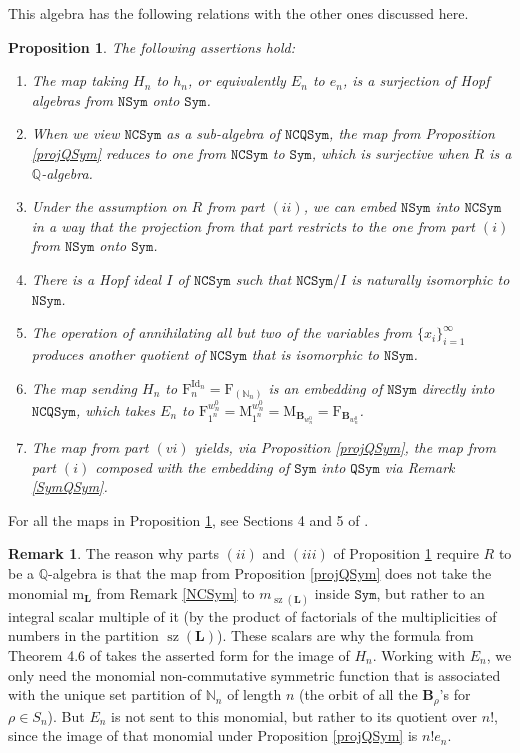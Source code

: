\documentclass{article}
\newtheorem{prop}[thm]{Proposition}
\theoremstyle{definition}
\newtheorem{rmk}[thm]{Remark}
\begin{document}
This algebra has the following relations with the other ones discussed here.
\begin{prop}
The following assertions hold:
\begin{enumerate}[$(i)$]
\item The map taking $H_{n}$ to $h_{n}$, or equivalently $E_{n}$ to $e_{n}$, is a surjection of Hopf algebras from $\mathtt{NSym}$ onto $\mathtt{Sym}$.
\item When we view $\mathtt{NCSym}$ as a sub-algebra of $\mathtt{NCQSym}$, the map from Proposition \ref{projQSym} reduces to one from $\mathtt{NCSym}$ to $\mathtt{Sym}$, which is surjective when $R$ is a $\mathbb{Q}$-algebra.
\item Under the assumption on $R$ from part $(ii)$, we can embed $\mathtt{NSym}$ into $\mathtt{NCSym}$ in a way that the projection from that part restricts to the one from part $(i)$ from $\mathtt{NSym}$ onto $\mathtt{Sym}$.
\item There is a Hopf ideal $I$ of $\mathtt{NCSym}$ such that $\mathtt{NCSym}/I$ is naturally isomorphic to $\mathtt{NSym}$.
\item The operation of annihilating all but two of the variables from $\{x_{i}\}_{i=1}^{\infty}$ produces another quotient of $\mathtt{NCSym}$ that is isomorphic to $\mathtt{NSym}$.
\item The map sending $H_{n}$ to $\mathrm{F}_{n}^{\operatorname{Id}_{n}}=\mathrm{F}_{(\mathbb{N}_{n})}$ is an embedding of $\mathtt{NSym}$ directly into $\mathtt{NCQSym}$, which takes $E_{n}$ to $\mathrm{F}_{1^{n}}^{w^{0}_{n}}=\mathrm{M}_{1^{n}}^{w^{0}_{n}}=\mathrm{M}_{\mathbf{B}_{w^{0}_{n}}}=\mathrm{F}_{\mathbf{B}_{w^{0}_{n}}}$.
\item The map from part $(vi)$ yields, via Proposition \ref{projQSym}, the map from part $(i)$ composed with the embedding of $\mathtt{Sym}$ into $\mathtt{QSym}$ via Remark \ref{SymQSym}.
\end{enumerate} \label{NSym}
\end{prop}
For all the maps in Proposition \ref{NSym}, see Sections 4 and 5 of \cite{[BRRZ]}.
\begin{rmk}
The reason why parts $(ii)$ and $(iii)$ of Proposition \ref{NSym} require $R$ to be a $\mathbb{Q}$-algebra is that the map from Proposition \ref{projQSym} does not take the monomial $\mathrm{m}_{\mathbf{L}}$ from Remark \ref{NCSym} to $m_{\operatorname{sz}(\mathbf{L})}$ inside $\mathtt{Sym}$, but rather to an integral scalar multiple of it (by the product of factorials of the multiplicities of numbers in the partition $\operatorname{sz}(\mathbf{L})$). These scalars are why the formula from Theorem 4.6 of \cite{[BRRZ]} takes the asserted form for the image of $H_{n}$. Working with $E_{n}$, we only need the monomial non-commutative symmetric function that is associated with the unique set partition of $\mathbb{N}_{n}$ of length $n$ (the orbit of all the $\mathbf{B}_{\rho}$'s for $\rho \in S_{n}$). But $E_{n}$ is not sent to this monomial, but rather to its quotient over $n!$, since the image of that monomial under Proposition \ref{projQSym} is $n!e_{n}$. \label{notoverQ}
\end{rmk}
\end{document}
